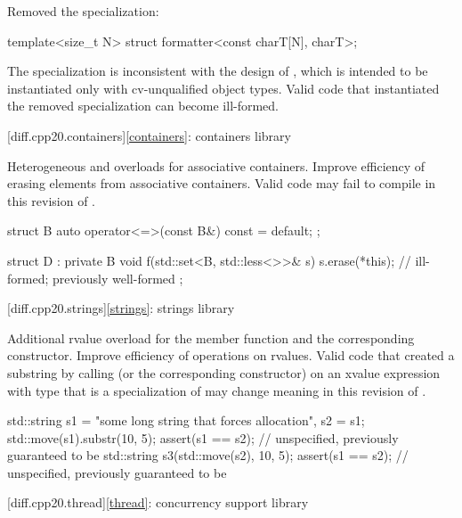 \change
Removed the  specialization:
\begin{codeblock}
template<size_t N> struct formatter<const charT[N], charT>;
\end{codeblock}
\rationale
The specialization is inconsistent with the design of ,
which is intended to be instantiated only with cv-unqualified object types.
\effect
Valid \CppXX{} code that instantiated the removed specialization
can become ill-formed.

[diff.cpp20.containers]{\ref*{containers}: containers library}

\change
Heterogeneous  and  overloads
for associative containers.
\rationale
Improve efficiency of erasing elements from associative containers.
\effect
Valid \CppXX{} code may fail to compile in this revision of \Cpp{}.
\begin{example}
\begin{codeblock}
struct B {
  auto operator<=>(const B&) const = default;
};

struct D : private B {
  void f(std::set<B, std::less<>>& s) {
    s.erase(*this);             // ill-formed; previously well-formed
  }
};
\end{codeblock}
\end{example}

[diff.cpp20.strings]{\ref*{strings}: strings library}

\change
Additional rvalue overload for the  member function and
the corresponding constructor.
\rationale
Improve efficiency of operations on rvalues.
\effect
Valid \CppXX{} code that created a substring
by calling  (or the corresponding constructor)
on an xvalue expression with type 
that is a specialization of 
may change meaning in this revision of \Cpp{}.
\begin{example}
\begin{codeblock}
std::string s1 = "some long string that forces allocation", s2 = s1;
std::move(s1).substr(10, 5);
assert(s1 == s2);       // unspecified, previously guaranteed to be 
std::string s3(std::move(s2), 10, 5);
assert(s1 == s2);       // unspecified, previously guaranteed to be 
\end{codeblock}
\end{example}

[diff.cpp20.thread]{\ref*{thread}: concurrency support library}

